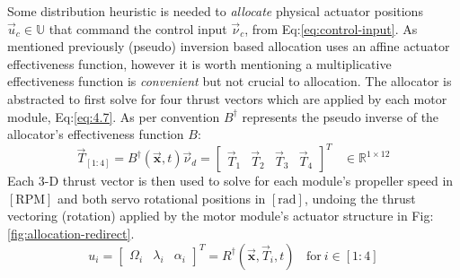 \par
Some distribution heuristic is needed to \emph{allocate} physical actuator positions $\vec{u}_c\in\mathbb{U}$ that command the control input $\vec{\nu}_c$, from Eq:\ref{eq:control-input}. As mentioned previously (pseudo) inversion based allocation uses an affine actuator effectiveness function, however it is worth mentioning a multiplicative effectiveness function is \emph{convenient} but not crucial to allocation. The allocator is abstracted to first solve for four thrust vectors which are applied by each motor module, Eq:\ref{eq:4.7}. As per convention $B^\dagger$ represents the pseudo inverse of the allocator's effectiveness function $B$:
\begin{equation}\label{eq:5.1}
\vec{T}_{[1:4]}=B^{\dagger}(\vec{\mathbf{x}},t)\vec{\nu}_d=\begin{bmatrix}
\vec{T}_1&\vec{T}_2&\vec{T}_3&\vec{T}_4
\end{bmatrix}^T~~~~\in\mathbb{R}^{1\times 12}
\end{equation}
Each 3-D thrust vector is then used to solve for each module's propeller speed in $[\text{RPM}]$ and both servo rotational positions in $[\text{rad}]$, undoing the thrust vectoring (rotation) applied by the motor module's actuator structure in Fig:\ref{fig:allocation-redirect}.
\begin{equation}
u_i = \begin{bmatrix}\Omega_i&\lambda_i&\alpha_i\end{bmatrix}^T=R^\dagger(\vec{\mathbf{x}},\vec{T}_i,t)~~~~\text{for}~i\in[1:4]
\end{equation}
